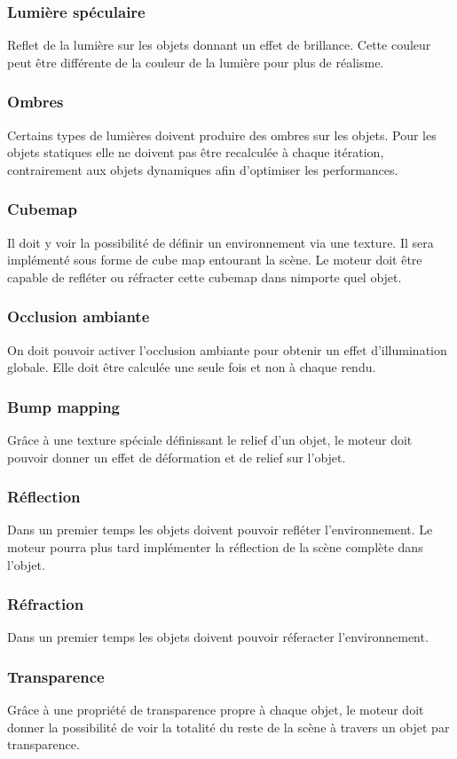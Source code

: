 \documentclass [a4 paper,11pt]{article}
\begin{document}
\subsubsection*{Lumière spéculaire}
Reflet de la lumière sur les objets donnant un effet de brillance. Cette couleur peut être différente de la couleur de la lumière pour plus de réalisme.
\subsubsection*{Ombres}
Certains types de lumières doivent produire des ombres sur les objets. 
Pour les objets statiques elle ne doivent pas être recalculée à chaque itération, contrairement aux objets dynamiques afin d'optimiser les performances.
\subsubsection*{Cubemap}
Il doit y voir la possibilité de définir un environnement via une texture. 
Il sera implémenté sous forme de cube map entourant la scène.
Le moteur doit être capable de refléter ou réfracter cette cubemap dans nimporte quel objet.
\subsubsection*{Occlusion ambiante}
On doit pouvoir activer l'occlusion ambiante pour obtenir un effet d'illumination globale.
Elle doit être calculée une seule fois et non à chaque rendu.
\subsubsection*{Bump mapping}
Grâce à une texture spéciale définissant le relief d'un objet, le moteur doit pouvoir donner un effet de déformation et de relief sur l'objet.
\subsubsection*{Réflection}
Dans un premier temps les objets doivent pouvoir refléter l'environnement.
Le moteur pourra plus tard implémenter la réflection de la scène complète dans l'objet.
\subsubsection*{Réfraction}
Dans un premier temps les objets doivent pouvoir réferacter l'environnement.
\subsubsection*{Transparence}
Grâce à une propriété de transparence propre à chaque objet, le moteur doit donner la possibilité de voir la totalité du reste de la scène à travers un objet par transparence.
\end{document}
